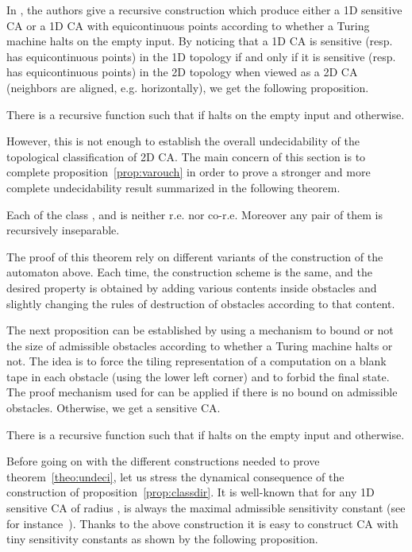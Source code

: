 \documentclass{llncs}
\begin{document}
In \cite{varouch}, the authors give a recursive construction which
produce either a 1D sensitive CA or a 1D CA with equicontinuous points
according to whether a Turing machine halts on the empty input. By
noticing that a 1D CA is sensitive (resp. has equicontinuous points)
in the 1D topology if and only if it is sensitive (resp. has
equicontinuous points) in the 2D topology when viewed as a 2D CA
(neighbors are aligned, e.g. horizontally), we get the following
proposition.

\begin{proposition}
  \label{prop:varouch}
  There is a recursive function 
  such that  if  halts on the
  empty input and  otherwise.
\end{proposition}

However, this is not enough to establish the overall undecidability of
the topological classification of 2D CA. The main concern of this
section is to complete proposition~\ref{prop:varouch} in order to
prove a stronger and more complete undecidability result summarized in
the following theorem.

\begin{theorem}
  \label{theo:undeci}
  Each of the class ,  and  is neither r.e. nor
  co-r.e.  Moreover any pair of them is recursively inseparable.
\end{theorem}

The proof of this theorem rely on different variants of the
construction of the automaton  above. Each time, the construction
scheme is the same, and the desired property is obtained by adding
various contents inside obstacles and slightly changing the rules of
destruction of obstacles according to that content.

The next proposition can be established by using a mechanism to bound
or not the size of admissible obstacles according to whether a Turing
machine halts or not. The idea is to force the tiling representation
of a computation on a blank tape in each obstacle (using the lower
left corner) and to forbid the final state. The proof mechanism used
for  can be applied if there is no bound on admissible
obstacles. Otherwise, we get a sensitive CA.

\begin{proposition}
  \label{prop:classdir}
  There is a recursive function 
  such that  if  halts on the
  empty input and  otherwise.
\end{proposition}

Before going on with the different constructions needed to prove
theorem~\ref{theo:undeci}, let us stress the dynamical consequence of
the construction of proposition~\ref{prop:classdir}.  It is well-known
that for any 1D sensitive CA of radius ,  is always the
maximal admissible sensitivity constant (see for
instance~\cite{Kurka97}). Thanks to the above construction it is easy
to construct CA with tiny sensitivity constants as shown by the
following proposition.
\end{document}
